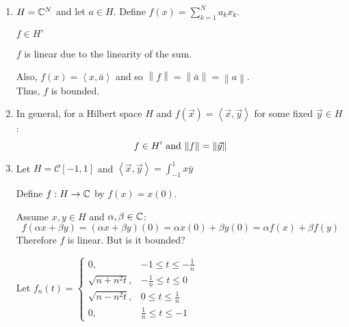 \documentclass[letterpaper,12pt,fleqn]{article}
\newcommand{\vx}{\vec{x}}
\newcommand{\vy}{\vec{y}}
\newcommand{\norm}[1]{\left\|#1\right\|}
\newcommand{\inner}[1]{\left<#1\right>}
\newcommand{\mc}{\mathcal{C}}
\renewcommand{\a}{\alpha}
\renewcommand{\b}{\beta}
\begin{document}
\begin{examples}
  \listbreak
  \begin{enumerate}
  \item $H=\mathbb{C}^N$ and let $a\in H$. Define $f(x)=\sum_{k=1}^Na_kx_k$.
    
    $f\in H'$

    $f$ is linear due to the linearity of the sum.
    
    Also, $f(x)=\inner{x,\bar{a}}$ and so
    $\norm{f}=\norm{\bar{a}}=\norm{a}$. \\
    Thus, $f$ is bounded.

  \item In general, for a Hilbert space $H$ and $f(\vx)=\inner{\vx,\vy}$
    for some fixed $\vy\in H$:
    \[f\in H'$\ \mbox{and}\ $\norm{f}=\norm{\vy}\]

  \item Let $H=\mc[-1,1]$ and $\inner{\vx,\vy}=\int_{-1}^1x\bar{y}$

    Define $f:H\to\mathbb{C}$ by $f(x)=x(0)$.

    \newpage

    Assume $x,y\in H$ and $\a,\b\in\C$:
    \[f(\a x+\b y)=(\a x+\b y)(0)=\a x(0)+\b y(0)=\a f(x)+\b f(y)\]
    Therefore $f$ is linear. But is it bounded?

    \begin{minipage}{4in}
      Let $f_n(t)=\begin{cases}
      0, & -1\le t\le-\frac{1}{n} \\
      \sqrt{n+n^2t}, & -\frac{1}{n}\le t\le0 \\
      \sqrt{n-n^2t}, & 0\le t\le\frac{1}{n} \\
      0, & \frac{1}{n}\le t\le-1
      \end{cases}$
    \end{minipage}
    \begin{minipage}{3in}
    \end{minipage}


\end{enumerate}
\end{examples}
\end{document}

